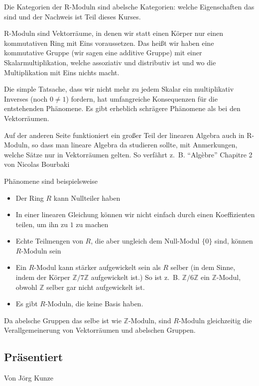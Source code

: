 \documentclass[a4paper]{amsart}
\theoremstyle{definition}
\newcommand{\Z}{\ensuremath{\mathbb{ Z }}}
\newcommand{\zb}{z.~B. }
\begin{document}
Die Kategorien der R-Moduln sind abelsche Kategorien: welche Eigenschaften das sind und der Nachweis ist Teil dieses Kurses.

R-Moduln sind Vektorräume, in denen wir statt einen Körper nur einen kommutativen Ring mit Eins voraussetzen. Das heißt wir haben eine kommutative Gruppe (wir sagen eine additive Gruppe) mit einer Skalarmultiplikation, welche assoziativ und distributiv ist und wo die Multiplikation mit Eins nichts macht.

Die simple Tatsache, dass wir nicht mehr zu jedem Skalar ein multiplikativ Inverses (noch $0 \ne 1$) fordern, hat umfangreiche Konsequenzen für die entstehenden Phänomene. Es gibt erheblich schrägere Phänomene als bei den Vektorräumen.

Auf der anderen Seite funktioniert ein großer Teil der linearen Algebra auch in R-Moduln, so dass man lineare Algebra da studieren sollte, mit Anmerkungen, welche Sätze nur in Vektorräumen gelten. So verfährt \zb "`Algèbre"' Chapitre 2 von Nicolas Bourbaki \cite{A1-3}

Phänomene sind beispielsweise
\begin{itemize}
   \item Der Ring $R$ kann Nullteiler haben
   \item In einer linearen Gleichung können wir nicht einfach durch einen Koeffizienten teilen, um ihn zu $1$ zu machen
   \item Echte Teilmengen von $R$, die aber ungleich dem Null-Modul $\{0\}$ sind, können $R$-Moduln sein
   \item Ein $R$-Modul kann stärker aufgewickelt sein als $R$ selber (in dem Sinne, indem der Körper $\Z / 7 \Z$ aufgewickelt ist.) So ist \zb $\Z / 6 \Z$ ein $\Z$-Modul, obwohl $\Z$ selber gar nicht aufgewickelt ist.
   \item Es gibt $R$-Moduln, die keine Basis haben.
\end{itemize}

Da abelsche Gruppen das selbe ist wie $\Z$-Moduln, sind $R$-Moduln gleichzeitig die Verallgemeinerung von Vektorräumen und abelschen Gruppen.

\subsection*{Präsentiert}
Von Jörg Kunze
\end{document}

